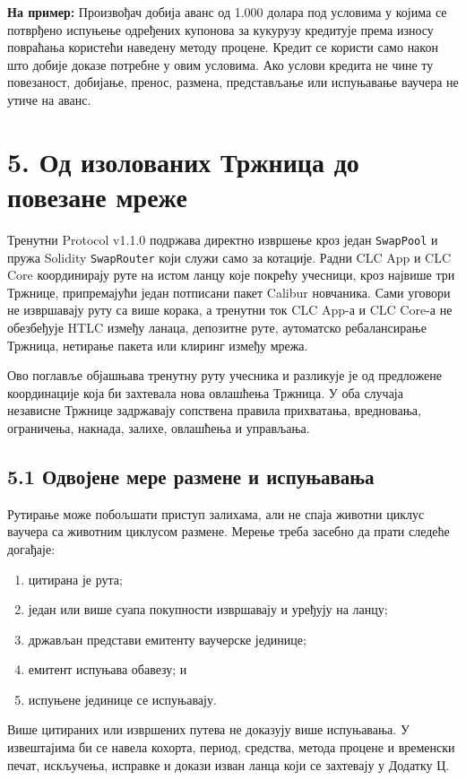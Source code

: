 \documentclass[11pt]{article}
\begin{document}
\textbf{На пример:} Произвођач добија аванс од 1.000 долара под условима у којима се потврђено испуњење одређених купонова за кукурузу кредитује према износу повраћања користећи наведену методу процене. Кредит се користи само након што добије доказе потребне у овим условима. Ако услови кредита не чине ту повезаност, добијање, пренос, размена, представљање или испуњавање ваучера не утиче на аванс.


\section*{5. Од изолованих Тржница до повезане мреже}

Тренутни Protocol v1.1.0 подржава директно извршење кроз један \texttt{SwapPool} и пружа Solidity \texttt{SwapRouter} који служи само за котације. Радни CLC App и CLC Core координирају руте на истом ланцу које покрећу учесници, кроз највише три Тржнице, припремајући један потписани пакет Calibur новчаника. Сами уговори не извршавају руту са више корака, а тренутни ток CLC App-а и CLC Core-а не обезбеђује HTLC између ланаца, депозитне руте, аутоматско ребалансирање Тржница, нетирање пакета или клиринг између мрежа.

Ово поглавље објашњава тренутну руту учесника и разликује је од предложене координације која би захтевала нова овлашћења Тржница. У оба случаја независне Тржнице задржавају сопствена правила прихватања, вредновања, ограничења, накнада, залихе, овлашћења и управљања.

\subsection*{5.1 Одвојене мере размене и испуњавања}

Рутирање може побољшати приступ залихама, али не спаја животни циклус ваучера са животним циклусом размене. Мерење треба засебно да прати следеће догађаје:

\begin{enumerate}[leftmargin=*]
\item цитирана је рута;
\item један или више суапа покупности извршавају и уређују на ланцу;
\item држављан представи емитенту ваучерске јединице;
\item емитент испуњава обавезу; и
\item испуњене јединице се испуњавају.
\end{enumerate}
Више цитираних или извршених путева не доказују више испуњавања. У извештајима би се навела кохорта, период, средства, метода процене и временски печат, искључења, исправке и докази изван ланца који се захтевају у Додатку Ц.
\end{document}
